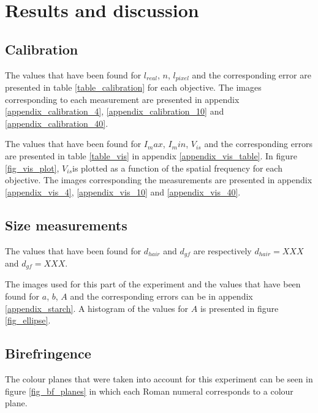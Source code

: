 \section{Results and discussion}

\subsection{Calibration}

The values that have been found for $l_{real}$, $n$, $l_{pixel}$ and the corresponding error are presented in table \ref{table_calibration} for each objective. The images corresponding to each measurement are presented in appendix \ref{appendix_calibration_4}, \ref{appendix_calibration_10} and \ref{appendix_calibration_40}.


The values that have been found for $I_max$, $I_min$, $V_{is}$ and the corresponding errors are presented in table \ref{table_vis} in appendix \ref{appendix_vis_table}. In figure \ref{fig_vis_plot}, $V_{is}$is plotted as a function of the spatial frequency for each objective. The images corresponding the measurements are presented in appendix \ref{appendix_vis_4}, \ref{appendix_vis_10} and \ref{appendix_vis_40}.



\subsection{Size measurements}

The values that have been found for $d_{hair}$ and $d_{gf}$ are respectively $d_{hair} = XXX $ and $d_{gf} = XXX $. 


The images used for this part of the experiment and the values that have been found for $a$, $b$, $A$ and the corresponding errors can be  in appendix \ref{appendix_starch}. A histogram of the values for $A$ is presented in figure \ref{fig_ellipse}.



\subsection{Birefringence}

The colour planes that were taken into account for this experiment can be seen in figure \ref{fig_bf_planes} in which each Roman numeral corresponds to a colour plane. 

